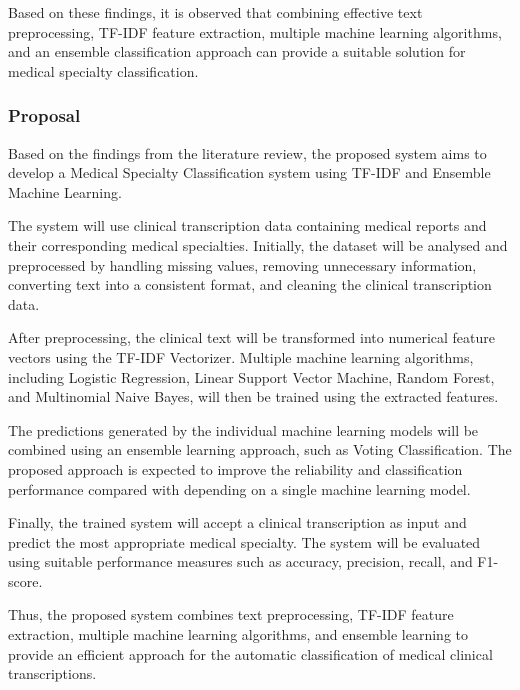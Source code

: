 Based on these findings, it is observed that combining effective text preprocessing, TF-IDF feature extraction, multiple machine learning algorithms, and an ensemble classification approach can provide a suitable solution for medical specialty classification.

\subsubsection{Proposal}
Based on the findings from the literature review, the proposed system aims to develop a Medical Specialty Classification system using TF-IDF and Ensemble Machine Learning.

The system will use clinical transcription data containing medical reports and their corresponding medical specialties. Initially, the dataset will be analysed and preprocessed by handling missing values, removing unnecessary information, converting text into a consistent format, and cleaning the clinical transcription data.

After preprocessing, the clinical text will be transformed into numerical feature vectors using the TF-IDF Vectorizer. Multiple machine learning algorithms, including Logistic Regression, Linear Support Vector Machine, Random Forest, and Multinomial Naive Bayes, will then be trained using the extracted features.

The predictions generated by the individual machine learning models will be combined using an ensemble learning approach, such as Voting Classification. The proposed approach is expected to improve the reliability and classification performance compared with depending on a single machine learning model.

Finally, the trained system will accept a clinical transcription as input and predict the most appropriate medical specialty. The system will be evaluated using suitable performance measures such as accuracy, precision, recall, and F1-score.

Thus, the proposed system combines text preprocessing, TF-IDF feature extraction, multiple machine learning algorithms, and ensemble learning to provide an efficient approach for the automatic classification of medical clinical transcriptions.
